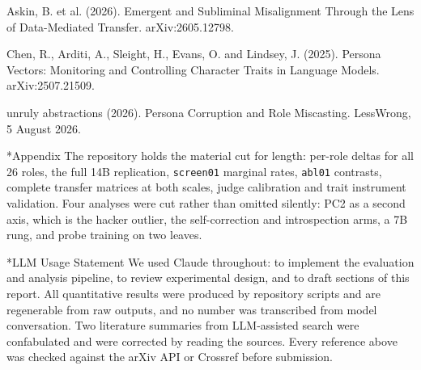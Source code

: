 \documentclass[10pt,letterpaper]{article}
\makeatletter
\renewcommand\section{\@startsection{section}{1}{0pt}{-5pt plus -1pt}{1.5pt}%
  {\normalfont\large\bfseries}}
\makeatother
\begin{document}
Askin, B. et al. (2026). Emergent and Subliminal Misalignment Through the Lens of Data-Mediated Transfer. arXiv:2605.12798.

Chen, R., Arditi, A., Sleight, H., Evans, O. and Lindsey, J. (2025). Persona Vectors: Monitoring and Controlling Character Traits in Language Models. arXiv:2507.21509.

unruly abstractions (2026). Persona Corruption and Role Miscasting. LessWrong, 5 August 2026.

\endgroup
\section*{Appendix}
The repository holds the material cut for length: per-role deltas for all 26 roles, the full 14B replication, \texttt{screen01} marginal rates, \texttt{abl01} contrasts, complete transfer matrices at both scales, judge calibration and trait instrument validation. Four analyses were cut rather than omitted silently: PC2 as a second axis, which is the hacker outlier, the self-correction and introspection arms, a 7B rung, and probe training on two leaves.

\section*{LLM Usage Statement}
We used Claude throughout: to implement the evaluation and analysis pipeline, to review experimental design, and to draft sections of this report. All quantitative results were produced by repository scripts and are regenerable from raw outputs, and no number was transcribed from model conversation. Two literature summaries from LLM-assisted search were confabulated and were corrected by reading the sources. Every reference above was checked against the arXiv API or Crossref before submission.
\end{document}
